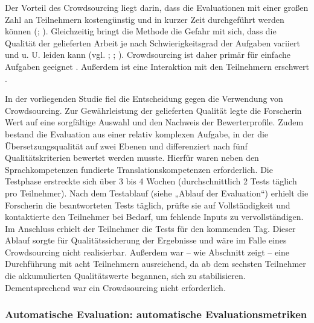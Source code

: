 Der Vorteil des Crowdsourcing liegt darin, dass die Evaluationen mit einer großen Zahl an Teilnehmern kostengünstig und in kurzer Zeit durchgeführt werden können (\citealt{SchenkGuittard2011}; \citealt{LiuEtAl2012}). Gleichzeitig bringt die Methode die Gefahr mit sich, dass die Qualität der gelieferten Arbeit je nach Schwierigkeitsgrad der Aufgaben variiert und u. U. leiden kann (vgl. \citealt{SchenkGuittard2011}; \citealt{LiuEtAl2012}; \citealt{Stevens2018}). Crowdsourcing ist daher primär für einfache Aufgaben geeignet \citep{Stevens2018}. Außerdem ist eine Interaktion mit den Teilnehmern erschwert \citep{LiuEtAl2012}.

In der vorliegenden Studie fiel die Entscheidung gegen die Verwendung von Crowdsourcing. Zur Gewährleistung der gelieferten Qualität legte die Forscherin Wert auf eine sorgfältige Auswahl und den Nachweis der Bewerterprofile. Zudem bestand die Evaluation aus einer relativ komplexen Aufgabe, in der die Übersetzungsqualität auf zwei Ebenen und differenziert nach fünf Qualitätskriterien bewertet werden musste. Hierfür waren neben den Sprachkompetenzen fundierte Translationskompetenzen erforderlich. Die Testphase erstreckte sich über 3 bis 4 Wochen (durchschnittlich 2 Tests täglich pro Teilnehmer). Nach dem Testablauf (siehe  „Ablauf der Evaluation“) erhielt die Forscherin die beantworteten Tests täglich, prüfte sie auf Vollständigkeit und kontaktierte den Teilnehmer bei Bedarf, um fehlende Inputs zu vervollständigen. Im Anschluss erhielt der Teilnehmer die Tests für den kommenden Tag. Dieser Ablauf sorgte für Qualitätssicherung der Ergebnisse und wäre im Falle eines Crowdsourcing nicht realisierbar. Außerdem war -- wie Abschnitt  zeigt -- eine Durchführung mit acht Teilnehmern ausreichend, da ab dem sechsten Teilnehmer die akkumulierten Qualitätswerte begannen, sich zu stabilisieren. Dementsprechend war ein Crowdsourcing nicht erforderlich.

\subsubsection{\label{sec:3.3.3.2} Automatische Evaluation: automatische Evaluationsmetriken}

